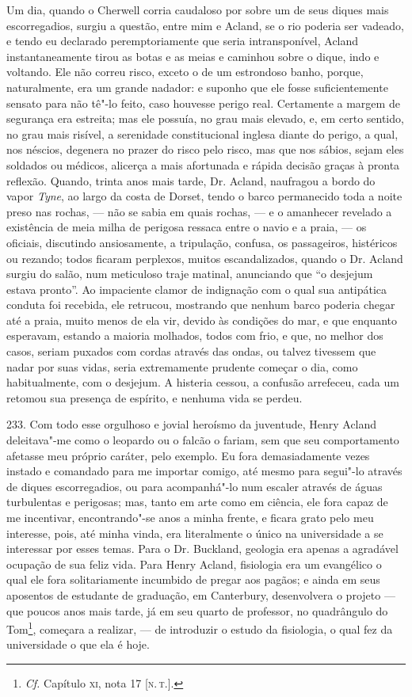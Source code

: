 Um dia, quando o Cherwell corria caudaloso por sobre um de seus diques
mais escorregadios, surgiu a questão, entre mim e Acland, se o rio
poderia ser vadeado, e tendo eu declarado peremptoriamente que seria
intransponível, Acland instantaneamente tirou as botas e as meias e
caminhou sobre o dique, indo e voltando. Ele não correu risco, exceto o
de um estrondoso banho, porque, naturalmente, era um grande nadador: e
suponho que ele fosse suficientemente sensato para não tê"-lo feito, caso
houvesse perigo real. Certamente a margem de segurança era estreita; mas
ele possuía, no grau mais elevado, e, em certo sentido, no grau mais
risível, a serenidade constitucional inglesa diante do perigo, a qual,
nos néscios, degenera no prazer do risco pelo risco, mas que nos sábios,
sejam eles soldados ou médicos, alicerça a mais afortunada e rápida
decisão graças à pronta reflexão. Quando, trinta anos mais tarde, Dr.
Acland, naufragou a bordo do vapor \emph{Tyne}, ao largo da costa de
Dorset, tendo o barco permanecido toda a noite preso nas rochas, --- não
se sabia em quais rochas, --- e o amanhecer revelado a existência de meia
milha de perigosa ressaca entre o navio e a praia, --- os oficiais,
discutindo ansiosamente, a tripulação, confusa, os passageiros,
histéricos ou rezando; todos ficaram perplexos, muitos escandalizados,
quando o Dr. Acland surgiu do salão, num meticuloso traje matinal,
anunciando que ``o desjejum estava pronto''. Ao impaciente clamor de
indignação com o qual sua antipática conduta foi recebida, ele retrucou,
mostrando que nenhum barco poderia chegar até a praia, muito menos de
ela vir, devido às condições do mar, e que enquanto esperavam, estando a
maioria molhados, todos com frio, e que, no melhor dos casos, seriam
puxados com cordas através das ondas, ou talvez tivessem que nadar por
suas vidas, seria extremamente prudente começar o dia, como
habitualmente, com o desjejum. A histeria cessou, a confusão arrefeceu,
cada um retomou sua presença de espírito, e nenhuma vida se perdeu.

233. Com todo esse orgulhoso e jovial heroísmo da juventude, Henry
Acland deleitava"-me como o leopardo ou o falcão o fariam, sem que seu
comportamento afetasse meu próprio caráter, pelo exemplo. Eu fora
demasiadamente vezes instado e comandado para me importar comigo, até
mesmo para segui"-lo através de diques escorregadios, ou para
acompanhá"-lo num escaler através de águas turbulentas e perigosas; mas,
tanto em arte como em ciência, ele fora capaz de me incentivar,
encontrando"-se anos a minha frente, e ficara grato pelo meu interesse,
pois, até minha vinda, era literalmente o único na universidade a se
interessar por esses temas. Para o Dr. Buckland, geologia era apenas a
agradável ocupação de sua feliz vida. Para Henry Acland, fisiologia era
um evangélico o qual ele fora solitariamente incumbido de pregar aos
pagãos; e ainda em seus aposentos de estudante de graduação, em
Canterbury, desenvolvera o projeto --- que poucos anos mais tarde, já em
seu quarto de professor, no quadrângulo do Tom\footnote{\emph{Cf.}
  Capítulo \textsc{xi}, nota 17 {[}\textsc{n.\,t.}{]}.}, começara a realizar, --- de
introduzir o estudo da fisiologia, o qual fez da universidade o que ela
é hoje.

